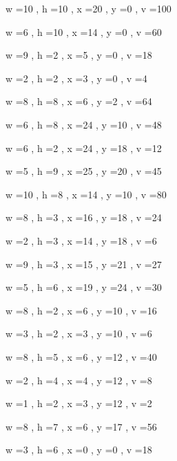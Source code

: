 \documentclass[11pt]{article}
\begin{document}
w =10 , h =10 , x =20 , y =0 , v =100
\par
w =6 , h =10 , x =14 , y =0 , v =60
\par
w =9 , h =2 , x =5 , y =0 , v =18
\par
w =2 , h =2 , x =3 , y =0 , v =4
\par
w =8 , h =8 , x =6 , y =2 , v =64
\par
w =6 , h =8 , x =24 , y =10 , v =48
\par
w =6 , h =2 , x =24 , y =18 , v =12
\par
w =5 , h =9 , x =25 , y =20 , v =45
\par
w =10 , h =8 , x =14 , y =10 , v =80
\par
w =8 , h =3 , x =16 , y =18 , v =24
\par
w =2 , h =3 , x =14 , y =18 , v =6
\par
w =9 , h =3 , x =15 , y =21 , v =27
\par
w =5 , h =6 , x =19 , y =24 , v =30
\par
w =8 , h =2 , x =6 , y =10 , v =16
\par
w =3 , h =2 , x =3 , y =10 , v =6
\par
w =8 , h =5 , x =6 , y =12 , v =40
\par
w =2 , h =4 , x =4 , y =12 , v =8
\par
w =1 , h =2 , x =3 , y =12 , v =2
\par
w =8 , h =7 , x =6 , y =17 , v =56
\par
w =3 , h =6 , x =0 , y =0 , v =18
\par
\newpage
\end{document}
